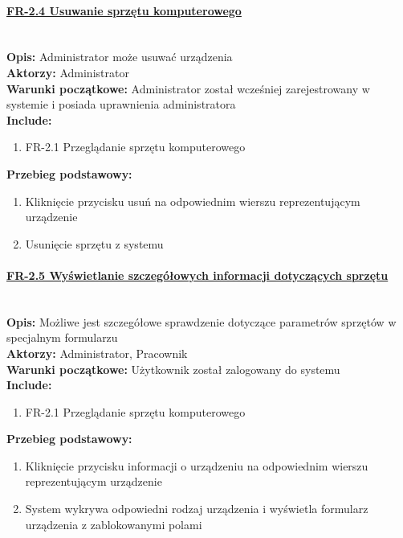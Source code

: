 \paragraph{\underline{FR-2.4 Usuwanie sprzętu komputerowego}}\mbox{}\\[1mm]
	\noindent\textbf{Opis:} Administrator może usuwać urządzenia\\
	\noindent\textbf{Aktorzy:} Administrator\\
	\textbf{Warunki początkowe:} Administrator został wcześniej zarejestrowany w systemie i posiada uprawnienia administratora\\
	\textbf{Include:} 
	\begin{enumerate}[noparskip]
		\item FR-2.1 Przeglądanie sprzętu komputerowego
	\end{enumerate}
    \textbf{Przebieg podstawowy:}
	\begin{enumerate}[noparskip]
		\item Kliknięcie przycisku usuń na odpowiednim wierszu reprezentującym urządzenie
		\item Usunięcie sprzętu z systemu
    \end{enumerate}

\paragraph{\underline{FR-2.5 Wyświetlanie szczegółowych informacji dotyczących sprzętu}}\mbox{}\\[1mm]
	\noindent\textbf{Opis:} Możliwe jest szczegółowe sprawdzenie dotyczące parametrów sprzętów w specjalnym formularzu\\
	\noindent\textbf{Aktorzy:} Administrator, Pracownik\\
	\textbf{Warunki początkowe:} Użytkownik został zalogowany do systemu\\
	\textbf{Include:} 
	\begin{enumerate}[noparskip]
		\item FR-2.1 Przeglądanie sprzętu komputerowego
	\end{enumerate}
    \textbf{Przebieg podstawowy:}
	\begin{enumerate}[noparskip]
		\item Kliknięcie przycisku informacji o urządzeniu na odpowiednim wierszu reprezentującym urządzenie
		\item System wykrywa odpowiedni rodzaj urządzenia i wyświetla formularz urządzenia z zablokowanymi polami 
    \end{enumerate}

